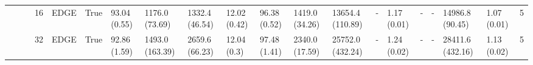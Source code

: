 \begin{tabular}{lllllllllllllllllllr}
                  &      &           & 16 & EDGE & True &              93.04 (0.55) &               1176.0 (73.69) &                1332.4 (46.54) &                 12.02 (0.42) &          96.38 (0.52) &           1419.0 (34.26) &          13654.4 (110.89) &              - &              1.17 (0.01) &                - &             - &    14986.8 (90.45) &          1.07 (0.01) &      5 \\
                  &      &           & 32 & EDGE & True &              92.86 (1.59) &              1493.0 (163.39) &                2659.6 (66.23) &                  12.04 (0.3) &          97.48 (1.41) &           2340.0 (17.59) &          25752.0 (432.24) &              - &              1.24 (0.02) &                - &             - &   28411.6 (432.16) &          1.13 (0.02) &      5 \\
\bottomrule
\end{tabular}